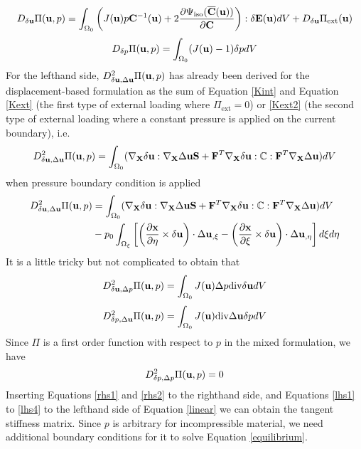\begin{equation}\label{rhs1}
D_{\delta\bold{u}}\Pi(\bold{u}, p) = \int_{\Omega_0}\left( J(\bold{u})p\bold{C}^{-1}(\bold{u}) + 
2\frac{\partial{\Psi_\mathrm{iso}(\overline{\bold{C}}(\bold{u}))}}{\partial{\bold{C}}}  \right) : \delta\bold{E}(\bold{u}) dV + D_{\delta\bold{u}}\Pi_\mathrm{ext}(\bold{u})
\end{equation}
\begin{equation}\label{rhs2}
D_{\delta{p}}\Pi(\bold{u}, p) = \int_{\Omega_0} (J(\bold{u}) - 1 )\delta{p} dV
\end{equation}
For the lefthand side, $D_{\delta\bold{u}, \Delta\bold{u}}^2 \Pi(\bold{u}, p)$ has already been derived for the displacement-based formulation as the sum of Equation \ref{Kint} and Equation \ref{Kext} (the first type of external loading where $\Pi_\mathrm{ext} = 0$) or \ref{Kext2} (the second type of external loading where a constant pressure is applied on the current boundary), i.e.
\begin{equation} \label{lhs0}
D_{\delta\bold{u}, \Delta\bold{u}}^2 \Pi(\bold{u}, p) =  \int_{\Omega_0}(\nabla_{\bold{X}}\delta\bold{u} : \nabla_{\bold{X}}\Delta\bold{u}\bold{S} + \bold{F}^T\nabla_{\bold{X}}\delta{\bold{u}} : \mathbb{C} : \bold{F}^T \nabla_{\bold{X}}\Delta\bold{u})dV  \end{equation}
when pressure boundary condition is applied
\begin{equation} \label{lhs1}
\begin{split}
D_{\delta\bold{u}, \Delta\bold{u}}^2 \Pi(\bold{u}, p) 
&= \int_{\Omega_0}(\nabla_{\bold{X}}\delta\bold{u} : \nabla_{\bold{X}}\Delta\bold{u}\bold{S} + \bold{F}^T\nabla_{\bold{X}}\delta{\bold{u}} : \mathbb{C} : \bold{F}^T \nabla_{\bold{X}}\Delta\bold{u})dV  \\
&-  p_0\int_{\Omega_{\xi}}  \left[\left(\frac{\partial{\bold{x}}}{\partial{\eta}} \times \delta\bold{u}\right) \cdot\Delta{\bold{u}}_{,\xi} - 
\left(\frac{\partial{\bold{x}}}{\partial{\xi}} \times \delta\bold{u}\right) \cdot\Delta{\bold{u}}_{,\eta} \right]d\xi{d\eta}
\end{split}
\end{equation}
It is a little tricky but not complicated to obtain that
\begin{equation} \label{lhs2}
D_{\delta\bold{u}, \Delta{p}}^2 \Pi(\bold{u}, p) = \int_{\Omega_0} J(\bold{u})\Delta{p}\mathrm{div}\delta{\bold{u}}dV
\end{equation}
\begin{equation} \label{lhs3}
D_{\delta{p}, \Delta\bold{u}}^2 \Pi(\bold{u}, p) = \int_{\Omega_0} J(\bold{u})\mathrm{div}\Delta{\bold{u}}\delta{p}dV
\end{equation}
Since $\Pi$ is a first order function with respect to $p$ in the mixed formulation, we have
\begin{equation} \label{lhs4}
D_{\delta{p}, \Delta{p}}^2 \Pi(\bold{u}, p) = 0
\end{equation}
Inserting Equations \ref{rhs1} and \ref{rhs2} to the righthand side, and Equations \ref{lhs1} to \ref{lhs4} to the lefthand side of Equation \ref{linear} we can obtain the tangent stiffness matrix. Since $p$ is arbitrary for incompressible material, we need additional boundary conditions for it to solve Equation \ref{equilibrium}.


